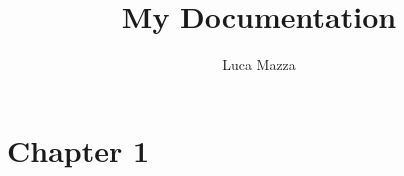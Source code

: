 \documentclass{article}
\title{My Documentation}
\author{Luca Mazza}
\begin{document}
\maketitle
\newpage
\tableofcontents
\newpage
\section{Chapter 1}\label{chapter-1}
\end{document}
